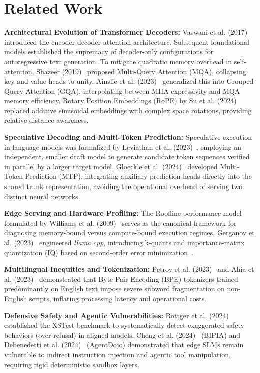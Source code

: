 \documentclass[10pt,a4paper,twocolumn]{article}
\begin{document}
\section{Related Work}

\textbf{Architectural Evolution of Transformer Decoders:} Vaswani et al. (2017)~\cite{vaswani2017} introduced the encoder-decoder attention architecture. Subsequent foundational models established the supremacy of decoder-only configurations for autoregressive text generation. To mitigate quadratic memory overhead in self-attention, Shazeer (2019)~\cite{shazeer2019} proposed Multi-Query Attention (MQA), collapsing key and value heads to unity. Ainslie et al. (2023)~\cite{ainslie2023} generalized this into Grouped-Query Attention (GQA), interpolating between MHA expressivity and MQA memory efficiency. Rotary Position Embeddings (RoPE) by Su et al. (2024)~\cite{su2024} replaced additive sinusoidal embeddings with complex space rotations, providing relative distance awareness.

\textbf{Speculative Decoding and Multi-Token Prediction:} Speculative execution in language models was formalized by Leviathan et al. (2023)~\cite{leviathan2023}, employing an independent, smaller draft model to generate candidate token sequences verified in parallel by a larger target model. Gloeckle et al. (2024)~\cite{gloeckle2024mtp} developed Multi-Token Prediction (MTP), integrating auxiliary prediction heads directly into the shared trunk representation, avoiding the operational overhead of serving two distinct neural networks.

\textbf{Edge Serving and Hardware Profiling:} The Roofline performance model formulated by Williams et al. (2009)~\cite{williams2009} serves as the canonical framework for diagnosing memory-bound versus compute-bound execution regimes. Gerganov et al. (2023)~\cite{gerganov2023llamacpp} engineered \emph{llama.cpp}, introducing k-quants and importance-matrix quantization (IQ) based on second-order error minimization~\cite{dettmers2022}.

\textbf{Multilingual Inequities and Tokenization:} Petrov et al. (2023)~\cite{petrov2023} and Ahia et al. (2023)~\cite{ahia2023} demonstrated that Byte-Pair Encoding (BPE) tokenizers trained predominantly on English text impose severe subword fragmentation on non-English scripts, inflating processing latency and operational costs.

\textbf{Defensive Safety and Agentic Vulnerabilities:} R\"ottger et al. (2024)~\cite{rottger2023} established the XSTest benchmark to systematically detect exaggerated safety behaviors (over-refusal) in aligned models. Cheng et al. (2024)~\cite{cheng2024} (BIPIA) and Debenedetti et al. (2024)~\cite{debenedetti2024} (AgentDojo) demonstrated that edge SLMs remain vulnerable to indirect instruction injection and agentic tool manipulation, requiring rigid deterministic sandbox layers.
\end{document}
